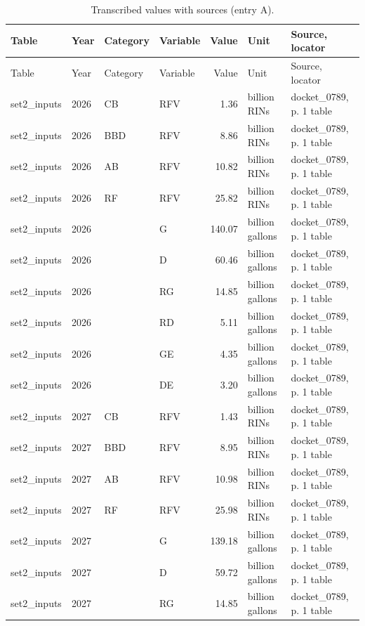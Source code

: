 \scriptsize
\begin{longtable}{p{2.3cm}p{0.7cm}p{1.0cm}p{2.6cm}rp{1.7cm}p{4.6cm}}
\caption{Transcribed values with sources (entry A).}\\
\toprule
Table & Year & Category & Variable & Value & Unit & Source, locator \\
\midrule
\endfirsthead
\toprule
Table & Year & Category & Variable & Value & Unit & Source, locator \\
\midrule
\endhead
\bottomrule
\endfoot
set2\_inputs & 2026 & CB & RFV & 1.36 & billion RINs & docket\_0789, p. 1 table \\
set2\_inputs & 2026 & BBD & RFV & 8.86 & billion RINs & docket\_0789, p. 1 table \\
set2\_inputs & 2026 & AB & RFV & 10.82 & billion RINs & docket\_0789, p. 1 table \\
set2\_inputs & 2026 & RF & RFV & 25.82 & billion RINs & docket\_0789, p. 1 table \\
set2\_inputs & 2026 &  & G & 140.07 & billion gallons & docket\_0789, p. 1 table \\
set2\_inputs & 2026 &  & D & 60.46 & billion gallons & docket\_0789, p. 1 table \\
set2\_inputs & 2026 &  & RG & 14.85 & billion gallons & docket\_0789, p. 1 table \\
set2\_inputs & 2026 &  & RD & 5.11 & billion gallons & docket\_0789, p. 1 table \\
set2\_inputs & 2026 &  & GE & 4.35 & billion gallons & docket\_0789, p. 1 table \\
set2\_inputs & 2026 &  & DE & 3.20 & billion gallons & docket\_0789, p. 1 table \\
set2\_inputs & 2027 & CB & RFV & 1.43 & billion RINs & docket\_0789, p. 1 table \\
set2\_inputs & 2027 & BBD & RFV & 8.95 & billion RINs & docket\_0789, p. 1 table \\
set2\_inputs & 2027 & AB & RFV & 10.98 & billion RINs & docket\_0789, p. 1 table \\
set2\_inputs & 2027 & RF & RFV & 25.98 & billion RINs & docket\_0789, p. 1 table \\
set2\_inputs & 2027 &  & G & 139.18 & billion gallons & docket\_0789, p. 1 table \\
set2\_inputs & 2027 &  & D & 59.72 & billion gallons & docket\_0789, p. 1 table \\
set2\_inputs & 2027 &  & RG & 14.85 & billion gallons & docket\_0789, p. 1 table \\

\end{longtable}
